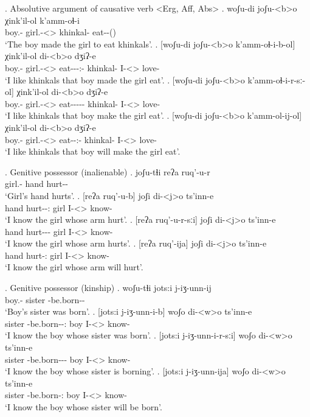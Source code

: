 \ex. Absolutive argument of causative verb <Erg, Aff, Abs>
	\ag. woʃu-di joʃu-<b>o χink'il-ol k'amm-oɬ-i\\
			{boy.\Obl-\Erg} {girl.\Obl-<\Nanf>\Aff} {khinkal-\Pl} {eat-\Caus-\Pst(\Aor)}\\
			\glt `The boy made the girl to eat khinkals'.
	\bg. [woʃu-di joʃu-<b>o k'amm-oɬ-i-b-ol] χink'il-ol di-<b>o dʒiʔ-e\\
			{boy.\Obl-\Erg} {girl.\Obl-<\Nanf>\Aff} {eat-\Caus-\Pst-\Ptcp:\Pst-\Pl} {khinkal-\Pl} {I-<\Nanf>\Aff} {love-\Hab}\\
			\glt `I like khinkals that boy made the girl eat'.
	\bg. [woʃu-di joʃu-<b>o k'amm-oɬ-i-r-sː-ol] χink'il-ol di-<b>o dʒiʔ-e\\
			{boy.\Obl-\Erg} {girl.\Obl-<\Nanf>\Aff} {eat-\Caus-\Pst-\Prog-\Attr-\Pl} {khinkal-\Pl} {I-<\Nanf>\Aff} {love-\Hab}\\
			\glt `I like khinkals that boy make the girl eat'.			
	\bg. [woʃu-di joʃu-<b>o k'amm-ol-ij-ol] χink'il-ol di-<b>o dʒiʔ-e\\
			{boy.\Obl-\Erg} {girl.\Obl-<\Nanf>\Aff} {eat-\Caus-\Ptcp:\Fut-\Pl} {khinkal-\Pl} {I-<\Nanf>\Aff} {love-\Hab}\\
			\glt `I like khinkals that boy will make the girl eat'.
						
\ex. Genitive possessor (inalienable)
	\ag. joʃu-tɬi reʔa ruq'-u-r\\
			{girl.\Obl-\Gen} hand {hurt-\Pst-\Prog}\\
			\glt `Girl's hand hurts'.
	\bg. [reʔa ruq'-u-b] joʃi di-<j>o ts'inn-e\\
			hand {hurt-\Pst-\Ptcp:\Pst} girl {I-<\F>\Aff} {know-\Hab}\\
			\glt `I know the girl whose arm hurt'.
	\bg. [reʔa ruq'-u-r-sːi] joʃi di-<j>o ts'inn-e\\
			hand {hurt-\Pst-\Prog-\Attr} girl {I-<\F>\Aff} {know-\Hab}\\
			\glt `I know the girl whose arm hurts'.			
	\bg. [reʔa ruq'-ija] joʃi di-<j>o ts'inn-e\\
			hand {hurt-\Ptcp:\Fut} girl {I-<\F>\Aff} {know-\Hab}\\
			\glt `I know the girl whose arm will hurt'.
			
\ex. Genitive possessor (kinship)
	\ag. woʃu-tɬi jots:i j-iʒ-unn-ij\\
			{boy.\Obl-\Gen} sister {\F-be.born-\Pst-\Pf}\\
			\glt `Boy's sister was born'.
	\bg. [jots:i j-iʒ-unn-i-b] woʃo di-<w>o ts'inn-e\\
			sister {\F-be.born-\Pst-\Ptcp:\Pst} boy {I-<\M>\Aff} {know-\Hab}\\
			\glt `I know the boy whose sister was born'.
	\bg. [jots:i j-iʒ-unn-i-r-sːi] woʃo di-<w>o ts'inn-e\\
			sister {\F-be.born-\Pst-\Prog-\Attr} boy {I-<\M>\Aff} {know-\Hab}\\
			\glt `I know the boy whose sister is borning'.
	\bg. [jots:i j-iʒ-unn-ija] woʃo di-<w>o ts'inn-e\\
			sister {\F-be.born-\Ptcp:\Fut} boy {I-<\M>\Aff} {know-\Hab}\\
			\glt `I know the boy whose sister will be born'.

